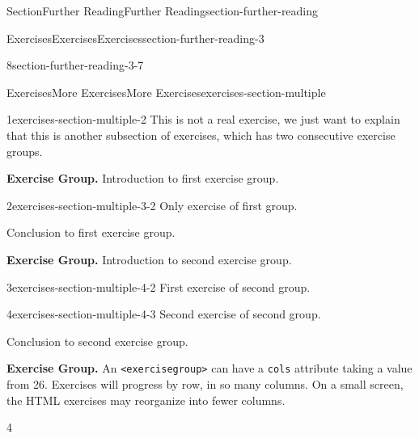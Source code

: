 \documentclass[twoside,10pt,]{article}
\newcommand{\mono}[1]{\texttt{#1}}
\numberwithin{equation}{section}
\begin{document}
\begin{sectionptx}{Section}{Further Reading}{}{Further Reading}{}{}{section-further-reading}
\begin{exercises-subsection}{Exercises}{Exercises}{}{Exercises}{}{}{section-further-reading-3}
\begin{divisionexercise}{8}{}{}{section-further-reading-3-7}
\begin{itemize}[label=\textbullet]
\end{itemize}
%
\end{divisionexercise}%
\end{exercises-subsection}
%
%
\typeout{************************************************}
\typeout{************************************************}
%
\begin{exercises-subsection}{Exercises}{More Exercises}{}{More Exercises}{}{}{exercises-section-multiple}
\begin{divisionexercise}{1}{}{}{exercises-section-multiple-2}%
This is not a real exercise, we just want to explain that this is another subsection of exercises, which has two consecutive exercise groups.%
\end{divisionexercise}%
\par\medskip\noindent%
\textbf{Exercise Group.}\space\space%
Introduction to first exercise group.%
\begin{exercisegroup}
\begin{divisionexerciseeg}{2}{}{}{exercises-section-multiple-3-2}%
Only exercise of first group.%
\end{divisionexerciseeg}%
\end{exercisegroup}
\par\noindent%
Conclusion to first exercise group.%
\par\medskip\noindent
\par\medskip\noindent%
\textbf{Exercise Group.}\space\space%
Introduction to second exercise group.%
\begin{exercisegroup}
\begin{divisionexerciseeg}{3}{}{}{exercises-section-multiple-4-2}%
First exercise of second group.%
\end{divisionexerciseeg}%
\begin{divisionexerciseeg}{4}{}{}{exercises-section-multiple-4-3}%
Second exercise of second group.%
\end{divisionexerciseeg}%
\end{exercisegroup}
\par\noindent%
Conclusion to second exercise group.%
\par\medskip\noindent
\par\medskip\noindent%
\textbf{Exercise Group.}\space\space%
An \mono{<exercisegroup>} can have a \mono{cols} attribute taking a value from 2\textendash{}6. Exercises will progress by row, in so many columns. On a small screen, the HTML exercises may reorganize into fewer columns.%
\begin{exercisegroupcol}{4}

\end{exercisegroupcol}
\end{exercises-subsection}
\end{sectionptx}
\end{document}
